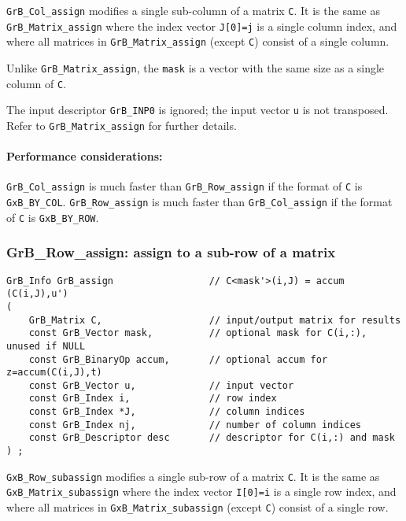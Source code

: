 \documentclass[12pt]{article}
\begin{document}
\verb'GrB_Col_assign' modifies a single sub-column of a matrix \verb'C'.  It is
the same as \verb'GrB_Matrix_assign' where the index vector \verb'J[0]=j' is a
single column index, and where all matrices in \verb'GrB_Matrix_assign' (except
\verb'C') consist of a single column.

Unlike \verb'GrB_Matrix_assign', the \verb'mask' is a vector with the same size
as a single column of \verb'C'.

The input descriptor \verb'GrB_INP0' is ignored; the input vector \verb'u' is
not transposed.  Refer to \verb'GrB_Matrix_assign' for further details.

\paragraph{\bf Performance considerations:} %
\verb'GrB_Col_assign' is much faster than \verb'GrB_Row_assign' if the format
of \verb'C' is \verb'GxB_BY_COL'.  \verb'GrB_Row_assign' is much faster than
\verb'GrB_Col_assign' if the format of \verb'C' is \verb'GxB_BY_ROW'.

\newpage
\subsubsection{{\sf GrB\_Row\_assign:} assign to a sub-row of a matrix}
\label{assign_row}

\begin{mdframed}[userdefinedwidth=6in]
{\footnotesize
\begin{verbatim}
GrB_Info GrB_assign                 // C<mask'>(i,J) = accum (C(i,J),u')
(
    GrB_Matrix C,                   // input/output matrix for results
    const GrB_Vector mask,          // optional mask for C(i,:), unused if NULL
    const GrB_BinaryOp accum,       // optional accum for z=accum(C(i,J),t)
    const GrB_Vector u,             // input vector
    const GrB_Index i,              // row index
    const GrB_Index *J,             // column indices
    const GrB_Index nj,             // number of column indices
    const GrB_Descriptor desc       // descriptor for C(i,:) and mask
) ;
\end{verbatim} } \end{mdframed}

\verb'GxB_Row_subassign' modifies a single sub-row of a matrix \verb'C'.  It is
the same as \verb'GxB_Matrix_subassign' where the index vector \verb'I[0]=i' is
a single row index, and where all matrices in \verb'GxB_Matrix_subassign'
(except \verb'C') consist of a single row.
\end{document}
